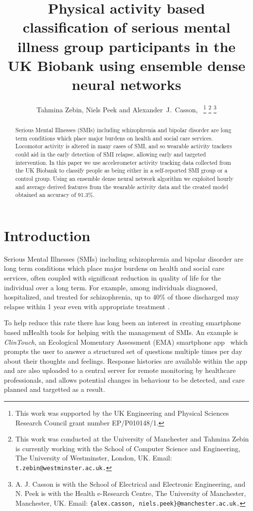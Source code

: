\documentclass[letterpaper, 10pt, conference]{ieeeconf} %
\title{\LARGE \bf Physical activity based classification of serious mental illness group participants in the UK Biobank using ensemble dense neural networks}
\author{Tahmina Zebin, Niels Peek and Alexander~J.~Casson,~\IEEEmembership{Senior Member,~IEEE}%
\thanks{This work was supported by the UK Engineering and Physical Sciences Research Council grant number EP/P010148/1. }%
\thanks{This work was conducted at the University of Manchester and Tahmina Zebin is currently working with the School of Computer Science and Engineering, The University of Westminster, London, UK. Email: \tt{\small{t.zebin@westminster.ac.uk}}.}%
\thanks{ A. J. Casson is with the School of Electrical and Electronic Engineering, and N. Peek is with the Health e-Research Centre, The University of Manchester, Manchester, UK. Email: \tt{\small{\{alex.casson, niels.peek\}@manchester.ac.uk}}.}%
}
\begin{document}
\maketitle
\thispagestyle{empty} %
\pagestyle{empty}


\begin{abstract}
Serious Mental Illnesses (SMIs) including schizophrenia and bipolar disorder are long term conditions which place major burdens on health and social care services. Locomotor activity  is altered in many cases of SMI, and so wearable activity trackers could aid in the early detection of SMI relapse, allowing early and targeted intervention. In this paper we use accelerometer activity tracking data collected from the UK Biobank to classify people as being either in a self-reported SMI group or a control group. Using an ensemble dense neural network algorithm we exploited hourly and average derived features from the wearable activity data and the created model obtained an accuracy of 91.3\%. 
\end{abstract}



\section{Introduction} \label{sec:introduction}
Serious Mental Illnesses (SMIs) including schizophrenia and bipolar disorder are long term conditions which place major burdens on health and social care services, often coupled with significant reduction in quality of life for the individual over a long term. For example, among individuals diagnosed, hospitalized, and treated for schizophrenia, up to 40\% of those discharged may relapse within 1 year even with appropriate treatment \cite{Tourus2018}. 

To help reduce this rate there has long been an interest in creating smartphone based mHealth tools for helping with the management of SMIs. An example is \emph{ClinTouch}, an Ecological Momentary Assessment (EMA) smartphone app~\cite{ref:jSHI08,ref:jWHE15} which prompts the user to answer a structured set of questions multiple times per day about their thoughts and feelings. Response histories are available within the app and are also uploaded to a central server for remote monitoring by healthcare professionals, and allows potential changes in behaviour to be detected, and care planned and targetted as a result.
\end{document}
